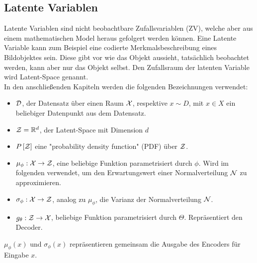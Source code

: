 \subsection{Latente Variablen}
Latente Variablen sind nicht beobachtbare Zufallsvariablen (ZV), welche aber aus einem mathematischen Model heraus gefolgert werden können. Eine Latente Variable kann zum Beispiel eine codierte Merkmalsbeschreibung eines Bildobjektes sein. Diese gibt vor wie das Objekt aussieht, tatsächlich beobachtet werden, kann aber nur das Objekt selbst. Den Zufallsraum der latenten Variable wird Latent-Space genannt.\\
In den anschließenden Kapiteln werden die folgenden Bezeichnungen verwendet:
\begin{itemize}
  \item $\mathcal{D}$, der Datensatz über einen Raum $\mathcal{X}$, respektive $x \sim D$, mit $x \in X$ ein beliebiger Datenpunkt aus dem Datensatz.
  \item $\mathcal{Z} = \mathbb{R}^d$, der Latent-Space mit Dimension $d$
  \item $P\left[ \mathcal{Z}\right]$ eine "probability density function" (PDF) über $\mathcal{Z}$.
  \item $\mu_\phi: \mathcal{X} \rightarrow \mathcal{Z}$, eine beliebige Funktion parametrisiert durch $\phi$. Wird im folgenden verwendet, um den Erwartungswert einer Normalverteilung $\mathcal{N}$ zu approximieren.
  \item $\sigma_\phi: \mathcal{X} \rightarrow \mathcal{Z}$, analog zu $\mu_\phi$, die Varianz der Normalverteilung $\mathcal{N}$.
  \item $g_\theta: \mathcal{Z} \rightarrow \mathcal{X}$, beliebige Funktion parametrisiert durch $\Theta$. Repräsentiert den Decoder.
\end{itemize}
$\mu_\phi(x)$ und $\sigma_\phi(x)$ repräsentieren gemeinsam die Ausgabe des Encoders für Eingabe $x$.\\

